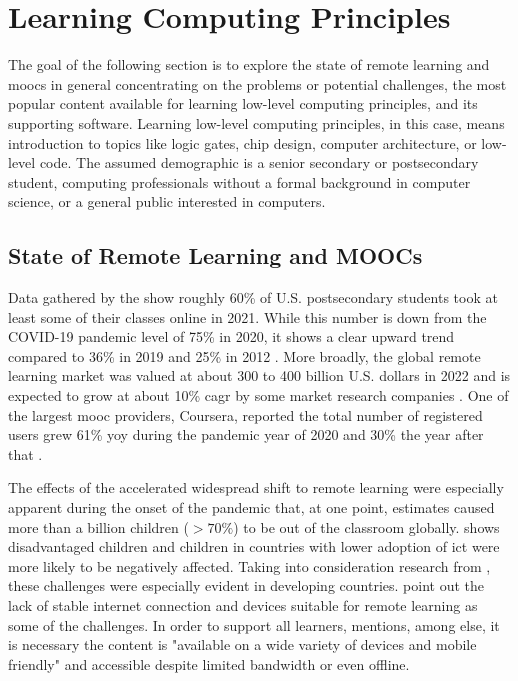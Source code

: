 \section{Learning Computing Principles}

The goal of the following section is to explore the state of remote learning and \glspl{mooc} in general concentrating on the problems or potential challenges, the most popular content available for learning low-level computing principles, and its supporting software.
Learning low-level computing principles, in this case, means introduction to topics like logic gates, chip design, computer architecture, or low-level code.
The assumed demographic is a senior secondary or postsecondary student, computing professionals without a formal background in computer science, or a general public interested in computers.

\subsection{State of Remote Learning and MOOCs}
\label{sec:learning-state}

Data gathered by the \textcite{us_doe_digest_2021} show roughly 60\% of U.S. postsecondary students took at least some of their classes online in 2021.
While this number is down from the COVID-19 pandemic level of 75\% in 2020, it shows a clear upward trend compared to 36\% in 2019 and 25\% in 2012 \parencite{us_doe_digest_2021}.
More broadly, the global remote learning market was valued at about 300 to 400 billion U.S. dollars in 2022 and is expected to grow at about 10\% \gls{cagr} by some market research companies \parencites{GlobalElearning_GIA_2023}{GlobalElearning_GMI_2023}.
One of the largest \gls{mooc} providers, Coursera, reported the total number of registered users grew 61\% \gls{yoy} during the pandemic year of 2020 and 30\% the year after that \parencite{Coursera_Impact_2021}.

The effects of the accelerated widespread shift to remote learning were especially apparent during the onset of the pandemic that, at one point, \textcite{UNESCO_2022} estimates caused more than a billion children ($>70\%$) to be out of the classroom globally.
\textcite{eu_covid_learning_2023} shows disadvantaged children and children in countries with lower adoption of \gls{ict} were more likely to be negatively affected.
Taking into consideration research from \textcite{tadesse_impact_2020}, these challenges were especially evident in developing countries.
\textcite{tadesse_impact_2020} point out the lack of stable internet connection and devices suitable for remote learning as some of the challenges.
In order to support all learners, \textcite{Ali_2020} mentions, among else, it is necessary the content is "available on a wide variety of devices and mobile friendly" and accessible despite limited bandwidth or even offline.


